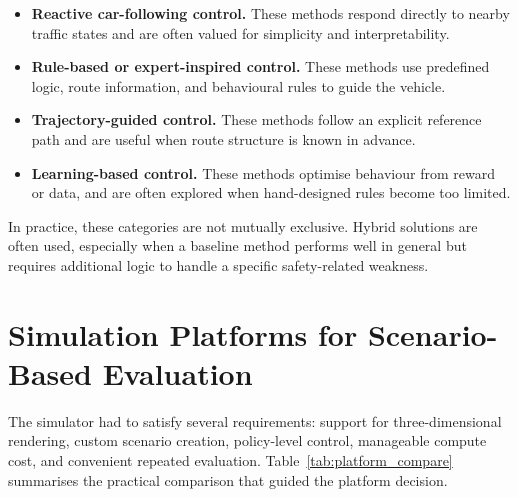 \documentclass[12pt,a4paper]{report}
\begin{document}
\begin{itemize}
    \item \textbf{Reactive car-following control.} These methods respond directly to nearby traffic states and are often valued for simplicity and interpretability.
    \item \textbf{Rule-based or expert-inspired control.} These methods use predefined logic, route information, and behavioural rules to guide the vehicle.
    \item \textbf{Trajectory-guided control.} These methods follow an explicit reference path and are useful when route structure is known in advance.
    \item \textbf{Learning-based control.} These methods optimise behaviour from reward or data, and are often explored when hand-designed rules become too limited.
\end{itemize}

In practice, these categories are not mutually exclusive. Hybrid solutions are often used, especially when a baseline method performs well in general but requires additional logic to handle a specific safety-related weakness.

\section{Simulation Platforms for Scenario-Based Evaluation}
The simulator had to satisfy several requirements: support for three-dimensional rendering, custom scenario creation, policy-level control, manageable compute cost, and convenient repeated evaluation. Table~\ref{tab:platform_compare} summarises the practical comparison that guided the platform decision.
\end{document}

